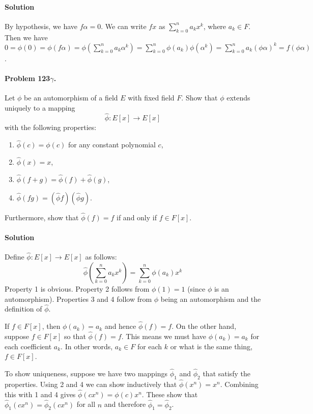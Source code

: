 \paragraph*{Solution}
By hypothesis, we have $f\alpha = 0$. We can write $fx$ as
$\sum_{k=0}^n a_k x^k$, where $a_k \in F$. Then we have
$0 = \phi(0) = \phi(f\alpha) = \phi(\sum_{k=0}^n a_k \alpha^k)
= \sum_{k=0}^n \phi(a_k) \phi(\alpha^k) = \sum_{k=0}^n a_k (\phi\alpha)^k
= f(\phi\alpha)$.

\paragraph{Problem 123$\gamma$.}
Let $\phi$ be an automorphism of a field $E$ with fixed field $F$. Show that
$\phi$ extends uniquely to a mapping $$\hat{\phi} : E[x] \rightarrow E[x]$$ with the
following properties:
\begin{enumerate}
\item $\hat{\phi}(c) = \phi(c)$ for any constant polynomial $c$,
\item $\hat{\phi}(x) = x$,
\item $\hat{\phi}(f+g) = \hat{\phi}(f) + \hat{\phi}(g)$,
\item $\hat{\phi}(fg) = (\hat{\phi} f)(\hat{\phi} g)$.

\end{enumerate}
Furthermore, show that $\hat{\phi}(f) = f$ if and only if $f \in F[x]$.

\paragraph*{Solution}
Define $\hat{\phi} : E[x] \rightarrow E[x]$ as follows:
$$ \hat{\phi}\left(\sum_{k=0}^{n} a_k x^k\right) = \sum_{k=0}^{n} \phi(a_k)x^k$$
Property 1 is obvious.
Property 2 follows from $\phi(1) = 1$ (since $\phi$ is an automorphism).
Properties 3 and 4 follow from $\phi$ being an automorphism and the definition
of $\hat{\phi}$.

If $f \in F[x]$, then $\phi(a_k) = a_k$ and hence $\hat{\phi}(f) = f$. On the
other hand, suppose $f \in F[x]$ so that $\hat{\phi}(f) = f$. This means we
must have $\phi(a_k) = a_k$ for each coefficient $a_k$. In other words,
$a_k \in F$ for each $k$ or what is the same thing, $f \in F[x]$.

To show uniqueness, suppose we have two mappings $\hat{\phi}_1$ and $\hat{\phi}_2$
that satisfy the properties.
Using 2 and 4 we can show inductively that $\hat{\phi} (x^n) = x^n$. Combining
this with 1 and 4 gives $\hat{\phi}(c x^n) = \phi(c) x^n$. These show that
$\hat{\phi}_1(c x^n) = \hat{\phi}_2(c x^n)$ for all $n$ and therefore
$\hat{\phi}_1 = \hat{\phi}_2$.

